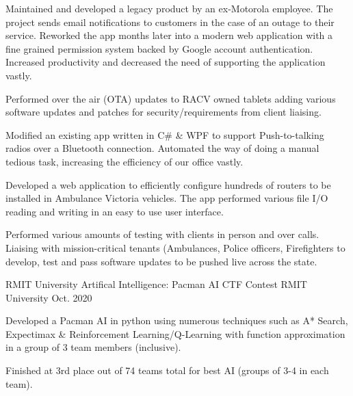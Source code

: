 \begin{cventries}
{\begin{cvitems}
		\item {Maintained and developed a legacy product by an ex-Motorola employee. The project sends email notifications to customers in the case of an outage to their service. Reworked the app months later into a modern web application with a fine grained permission system backed by Google account authentication. Increased productivity and decreased the need of supporting the application vastly.}
        \item {Performed over the air (OTA) updates to RACV owned tablets adding various software updates and patches for security/requirements from client liaising.}
		\item {Modified an existing app written in C\# \& WPF to support Push-to-talking radios over a Bluetooth connection. Automated the way of doing a manual tedious task, increasing the efficiency of our office vastly.}
        \item {Developed a web application to efficiently configure hundreds of routers to be installed in Ambulance Victoria vehicles. The app performed various file I/O reading and writing in an easy to use user interface.}
        \item {Performed various amounts of testing with clients in person and over calls. Liaising with mission-critical tenants (Ambulances, Police officers, Firefighters} to develop, test and pass software updates to be pushed live across the state.
      \end{cvitems}
    }
  \cventry
    {RMIT University}
    {Artifical Intelligence: Pacman AI CTF Contest}
    {RMIT University}
    {Oct. 2020}
    {
      \begin{cvitems}
        \item {Developed a Pacman AI in python using numerous techniques such as A* Search, Expectimax \& Reinforcement Learning/Q-Learning with function approximation in a group of 3 team members (inclusive).}
        \item {Finished at 3rd place out of 74 teams total for best AI (groups of 3-4 in each team).}
      \end{cvitems}
    }
\end{cventries}
